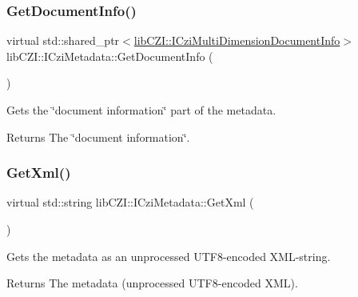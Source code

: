 \subsubsection{\texorpdfstring{Get\+Document\+Info()}{GetDocumentInfo()}}
{\footnotesize\ttfamily virtual std\+::shared\+\_\+ptr$<$\hyperlink{classlib_c_z_i_1_1_i_czi_multi_dimension_document_info}{lib\+C\+Z\+I\+::\+I\+Czi\+Multi\+Dimension\+Document\+Info}$>$ lib\+C\+Z\+I\+::\+I\+Czi\+Metadata\+::\+Get\+Document\+Info (\begin{DoxyParamCaption}{ }\end{DoxyParamCaption})\hspace{0.3cm}{\ttfamily [pure virtual]}}

Gets the \char`\"{}document information\char`\"{} part of the metadata.

\begin{DoxyReturn}{Returns}
The \char`\"{}document information\char`\"{}. 
\end{DoxyReturn}
\mbox{\label{classlib_c_z_i_1_1_i_czi_metadata_afd73a12ac5a04a725ad9f3d130f4e2de}} 
\subsubsection{\texorpdfstring{Get\+Xml()}{GetXml()}}
{\footnotesize\ttfamily virtual std\+::string lib\+C\+Z\+I\+::\+I\+Czi\+Metadata\+::\+Get\+Xml (\begin{DoxyParamCaption}{ }\end{DoxyParamCaption})\hspace{0.3cm}{\ttfamily [pure virtual]}}

Gets the metadata as an unprocessed U\+T\+F8-\/encoded X\+M\+L-\/string.

\begin{DoxyReturn}{Returns}
The metadata (unprocessed U\+T\+F8-\/encoded X\+ML). 
\end{DoxyReturn}
\mbox{\label{classlib_c_z_i_1_1_i_czi_metadata_aa0465981ea6ea4d2165c7dd20e4b6833}} 

